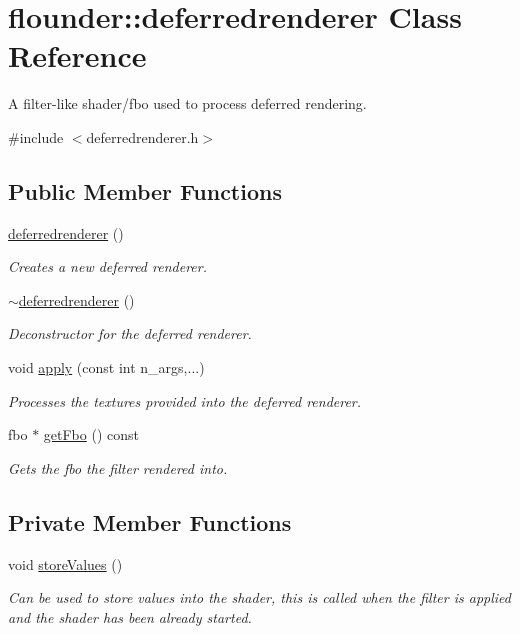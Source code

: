 \hypertarget{classflounder_1_1deferredrenderer}{}\section{flounder\+:\+:deferredrenderer Class Reference}
\label{classflounder_1_1deferredrenderer}


A filter-\/like shader/fbo used to process deferred rendering.  




{\ttfamily \#include $<$deferredrenderer.\+h$>$}

\subsection*{Public Member Functions}
\begin{DoxyCompactItemize}
\item 
\hyperlink{classflounder_1_1deferredrenderer_a1eb8e53d1705eaee945d28677fb41bcc}{deferredrenderer} ()
\begin{DoxyCompactList}\small\item\em Creates a new deferred renderer. \end{DoxyCompactList}\item 
\hyperlink{classflounder_1_1deferredrenderer_a7b884375d735aa7670be432b7567ec0b}{$\sim$deferredrenderer} ()
\begin{DoxyCompactList}\small\item\em Deconstructor for the deferred renderer. \end{DoxyCompactList}\item 
void \hyperlink{classflounder_1_1deferredrenderer_af369386b3a61385cd8ec2444662599c3}{apply} (const int n\+\_\+args,...)
\begin{DoxyCompactList}\small\item\em Processes the textures provided into the deferred renderer. \end{DoxyCompactList}\item 
fbo $\ast$ \hyperlink{classflounder_1_1deferredrenderer_a59a752dd9810f3809ff9e29bc92636e9}{get\+Fbo} () const
\begin{DoxyCompactList}\small\item\em Gets the fbo the filter rendered into. \end{DoxyCompactList}\end{DoxyCompactItemize}
\subsection*{Private Member Functions}
\begin{DoxyCompactItemize}
\item 
void \hyperlink{classflounder_1_1deferredrenderer_a4385f75bb3b15be6c91da12851432226}{store\+Values} ()
\begin{DoxyCompactList}\small\item\em Can be used to store values into the shader, this is called when the filter is applied and the shader has been already started. \end{DoxyCompactList}\end{DoxyCompactItemize}
